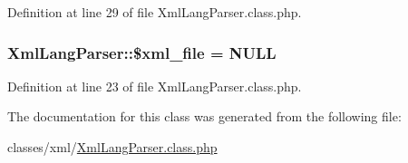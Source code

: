 Definition at line 29 of file Xml\-Lang\-Parser.\-class.\-php.

\hypertarget{classXmlLangParser_a95de36282488ee37a0ef18ef85a6697c}{
\subsubsection[{\$xml\-\_\-file}]{\setlength{\rightskip}{0pt plus 5cm}Xml\-Lang\-Parser\-::\$xml\-\_\-file = N\-U\-L\-L}}\label{classXmlLangParser_a95de36282488ee37a0ef18ef85a6697c}


Definition at line 23 of file Xml\-Lang\-Parser.\-class.\-php.



The documentation for this class was generated from the following file\-:\begin{DoxyCompactItemize}
\item 
classes/xml/\hyperlink{XmlLangParser_8class_8php}{Xml\-Lang\-Parser.\-class.\-php}\end{DoxyCompactItemize}
